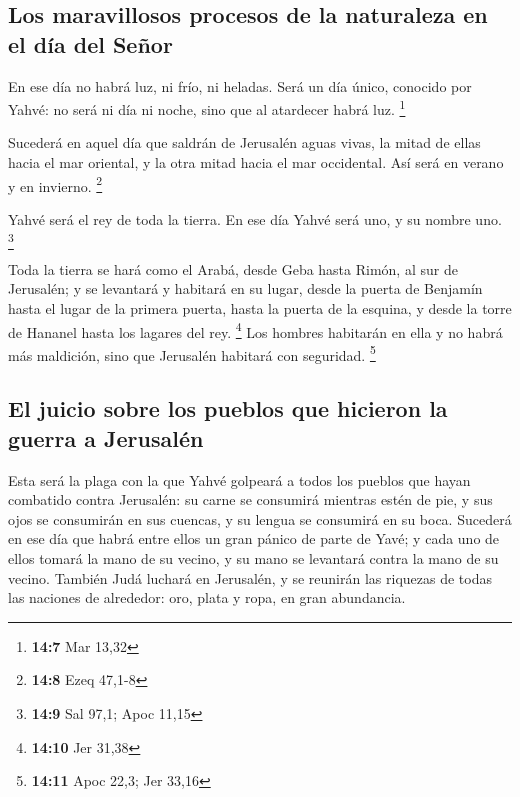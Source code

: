 \hypertarget{los-maravillosos-procesos-de-la-naturaleza-en-el-duxeda-del-seuxf1or}{%
\subsection{Los maravillosos procesos de la naturaleza en el día del
Señor}\label{los-maravillosos-procesos-de-la-naturaleza-en-el-duxeda-del-seuxf1or}}

 En ese día no habrá luz, ni frío, ni heladas.
 Será un día único, conocido por Yahvé: no será ni día ni
noche, sino que al atardecer habrá luz. \footnote{\textbf{14:7} Mar
  13,32}

 Sucederá en aquel día que saldrán de Jerusalén aguas
vivas, la mitad de ellas hacia el mar oriental, y la otra mitad hacia el
mar occidental. Así será en verano y en invierno. \footnote{\textbf{14:8}
  Ezeq 47,1-8}

 Yahvé será el rey de toda la tierra. En ese día Yahvé
será uno, y su nombre uno. \footnote{\textbf{14:9} Sal 97,1; Apoc 11,15}

 Toda la tierra se hará como el Arabá, desde Geba hasta
Rimón, al sur de Jerusalén; y se levantará y habitará en su lugar, desde
la puerta de Benjamín hasta el lugar de la primera puerta, hasta la
puerta de la esquina, y desde la torre de Hananel hasta los lagares del
rey. \footnote{\textbf{14:10} Jer 31,38}  Los hombres
habitarán en ella y no habrá más maldición, sino que Jerusalén habitará
con seguridad. \footnote{\textbf{14:11} Apoc 22,3; Jer 33,16}

\hypertarget{el-juicio-sobre-los-pueblos-que-hicieron-la-guerra-a-jerusaluxe9n}{%
\subsection{El juicio sobre los pueblos que hicieron la guerra a
Jerusalén}\label{el-juicio-sobre-los-pueblos-que-hicieron-la-guerra-a-jerusaluxe9n}}

 Esta será la plaga con la que Yahvé golpeará a todos los
pueblos que hayan combatido contra Jerusalén: su carne se consumirá
mientras estén de pie, y sus ojos se consumirán en sus cuencas, y su
lengua se consumirá en su boca.  Sucederá en ese día que
habrá entre ellos un gran pánico de parte de Yavé; y cada uno de ellos
tomará la mano de su vecino, y su mano se levantará contra la mano de su
vecino.  También Judá luchará en Jerusalén, y se reunirán
las riquezas de todas las naciones de alrededor: oro, plata y ropa, en
gran abundancia.

